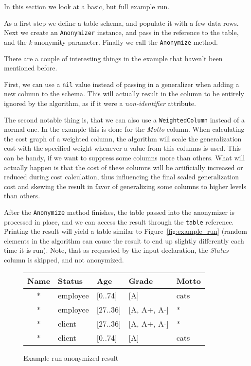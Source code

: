 In this section we look at a basic, but full example run.


As a first step we define a table schema, and populate it with a few data rows. Next we create an \texttt{Anonymizer} instance, and pass in the reference to the table, and the \textit{k} anonymity parameter. Finally we call the \texttt{Anonymize} method.

There are a couple of interesting things in the example that haven't been mentioned before.

First, we can use a \texttt{nil} value instead of passing in a generalizer when adding a new column to the schema. This will actually result in the column to be entirely ignored by the algorithm, as if it were a \textit{non-identifier} attribute.

The second notable thing is, that we can also use a \texttt{WeightedColumn} instead of a normal one. In the example this is done for the \textit{Motto} column. When calculating the cost graph of a weighted column, the algorithm will scale the generalization cost with the specified weight whenever a value from this columns is used. This can be handy, if we want to suppress some columns more than others. What will actually happen is that the cost of these columns will be artificially increased or reduced during cost calculation, thus influencing the final scaled generalization cost and skewing the result in favor of generalizing some columns to higher levels than others.

After the \texttt{Anonymize} method finishes, the table passed into the anonymizer is processed in place, and we can access the result through the \texttt{table} reference. Printing the result will yield a table similar to Figure~\ref{fig:example_run} (random elements in the algorithm can cause the result to end up slightly differently each time it is run). Note, that as requested by the input declaration, the \textit{Status} column is skipped, and not anonymized.

\vspace{\baselineskip}
\begin{figure}[ht]
    \centering
    \small
    \begin{tabular}{c l l l l}
        \toprule
        \textbf{Name} & \textbf{Status} & \textbf{Age} & \textbf{Grade} & \textbf{Motto} \\
        \midrule
        * & employee & [0..74]  & [A] & cats \\
        * & employee & [27..36] & [A, A+, A-] & * \\
        * & client   & [27..36] & [A, A+, A-] & * \\
        * & client   & [0..74] &  [A]         & cats \\
        \bottomrule
    \end{tabular}
    \caption{Example run anonymized result}
\end{figure}\label{fig:example_run}